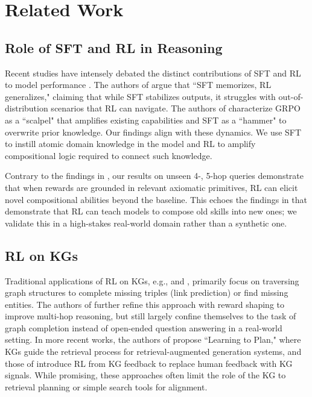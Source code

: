 \documentclass{article}
\theoremstyle{plain}
\theoremstyle{definition}
\theoremstyle{remark}
\begin{document}
\section{Related Work}


\subsection{Role of SFT and RL in Reasoning}
Recent studies have intensely debated the distinct contributions of SFT and RL to model performance \citep{jin2025rl, kang2025quagmires, matsutani2025rl}. The authors of \cite{chu2025sft} argue that ``SFT memorizes, RL generalizes," claiming that while SFT stabilizes outputs, it struggles with out-of-distribution scenarios that RL can navigate. The authors of \cite{Rajani2025} characterize GRPO as a ``scalpel" that amplifies existing capabilities and SFT as a ``hammer" to overwrite prior knowledge. Our findings align with these dynamics. We use SFT to instill atomic domain knowledge in the model and RL to amplify compositional logic required to connect such knowledge.


Contrary to the findings in \cite{yue2025does}, our results on unseen 4-, 5-hop queries demonstrate that when rewards are grounded in relevant axiomatic primitives, RL can elicit novel compositional abilities beyond the baseline. This echoes the findings in \cite{yuan2025f} that demonstrate that RL can teach models to compose old skills into new ones; we validate this in a high-stakes real-world domain rather than a synthetic one. 

\enlargethispage{2\baselineskip}
\subsection{RL on KGs}
Traditional applications of RL on KGs, e.g., \cite{DasGOLEARNING} and \cite{xiong2017deeppath}, primarily focus on traversing graph structures to complete missing triples (link prediction) or find missing entities. The authors of \cite{lin2018multi} further refine this approach with reward shaping to improve multi-hop reasoning, but still largely confine themselves to the task of graph completion instead of open-ended question answering in a real-world setting. In more recent works, the authors of \cite{Wang2024} propose ``Learning to Plan," where KGs guide the retrieval process for retrieval-augmented generation systems, and those of \cite{YanRLKGF} introduce RL from KG feedback to replace human feedback with KG signals. While promising, these approaches often limit the role of the KG to retrieval planning or simple search tools for alignment.
\end{document}
